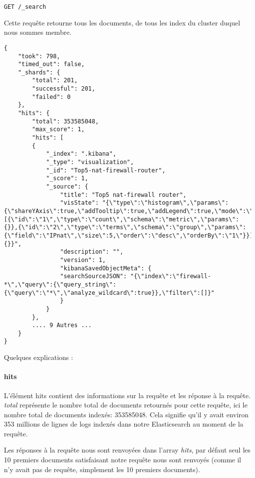 {\begin{lstlisting}[style=code,label={lst:APIsearchemptyexample1},caption={le "Hello World" de la recherche}]
GET /_search
\end{lstlisting}

Cette requête retourne tous les documents, de tous les index du cluster duquel nous
sommes membre.

\begin{lstlisting}[style=code,label={lst:APIsearchemptyexample2},caption={Réponse type à notre requête précédente}]
{
    "took": 798,
    "timed_out": false,
    "_shards": {
        "total": 201,
        "successful": 201,
        "failed": 0
    },
    "hits": {
        "total": 353585048,
        "max_score": 1,
        "hits": [
        {
            "_index": ".kibana",
            "_type": "visualization",
            "_id": "Top5-nat-firewall-router",
            "_score": 1,
            "_source": {
                "title": "Top5 nat-firewall router",
                "visState": "{\"type\":\"histogram\",\"params\":{\"shareYAxis\":true,\"addTooltip\":true,\"addLegend\":true,\"mode\":\"stacked\",\"defaultYExtents\":false},\"aggs\":[{\"id\":\"1\",\"type\":\"count\",\"schema\":\"metric\",\"params\":{}},{\"id\":\"2\",\"type\":\"terms\",\"schema\":\"group\",\"params\":{\"field\":\"IPnat\",\"size\":5,\"order\":\"desc\",\"orderBy\":\"1\"}}],\"listeners\":{}}",
                "description": "",
                "version": 1,
                "kibanaSavedObjectMeta": {
                "searchSourceJSON": "{\"index\":\"firewall-*\",\"query\":{\"query_string\":{\"query\":\"*\",\"analyze_wildcard\":true}},\"filter\":[]}"
                }
            }
        },
        .... 9 Autres ...
    }
}
\end{lstlisting}

Quelques explications :

\paragraph{hits}
L'élément hits contient des informations sur la requête et les réponse à la requête.
\textit{total} représente le nombre total de documents retournés pour cette requête, ici le 
nombre total de documents indexés: 353585048. 
Cela signifie qu'il y avait environ 353 millions de lignes
de logs indexés dans notre Elasticsearch au moment de la requête.

Les réponses à la requête nous sont renvoyées dans l'array \textit{hits}, par défaut
seul les 10 premiers documents satisfaisant notre requête nous sont renvoyés 
(comme il n'y avait pas de requête, simplement les 10 premiers documents).

}
